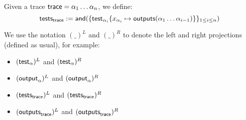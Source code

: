 \begin{definition}
  Given a trace $\textsf{trace} = \alpha_1 \dots \alpha_n$, we define:
  $$\textsf{tests}_{\textsf{trace}} := \mathsf{and}(\{ \textsf{test}_{\alpha_i}\{x_{\alpha_i}\mapsto\textsf{outputs}(\alpha_1 \dots \alpha_{i-1})\} \}_{1 \leq i \leq n})$$
\end{definition}

\bigskip
\noindent
We use the notation $(\_)^L$ and $(\_)^R$ to denote the left and right projections (defined as usual), for example:
\begin{itemize}
  \item $(\textsf{test}_{\alpha})^L$ and $(\textsf{test}_{\alpha})^R$
  \item $(\textsf{output}_{\alpha})^L$ and $(\textsf{output}_{\alpha})^R$
  \item $(\textsf{tests}_{\textsf{trace}})^L$ and $(\textsf{tests}_{\textsf{trace}})^R$
  \item $(\textsf{outputs}_{\textsf{trace}})^L$ and $(\textsf{outputs}_{\textsf{trace}})^R$
\end{itemize}
